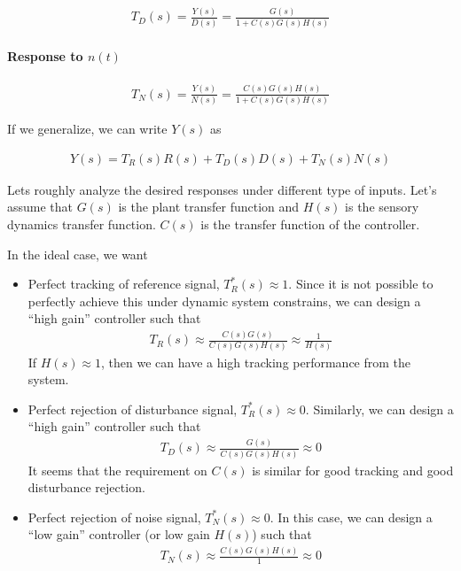 \documentclass[twoside]{article}
\begin{document}
    \begin{align*}
  	T_D(s) =  \frac{Y(s)}{D(s)} =  \frac{G(s)}{1 + C(s) G(s) H(s)}
  \end{align*}
  
    \paragraph{Response to $n(t)$}
    
\begin{align*}
  	T_N(s) =  \frac{Y(s)}{N(s)} =  \frac{C(s) G(s) H(s)}{1 + C(s) G(s) H(s)}
  \end{align*}
 
  If we generalize, we can write $Y(s)$ as 
  
  \begin{align*}
  Y(s) = T_R(s) R(s) + T_D(s) D(s) + T_N(s) N(s)
  \end{align*}
  
  Lets roughly analyze the desired responses under different type of inputs. 
  Let's assume that $G(s)$ is the plant transfer function and $H(s)$ is the sensory 
  dynamics transfer function. $C(s)$ is the 
  transfer function of the controller.
  
  In the ideal case, we want 
  \begin{itemize}
  	\item Perfect tracking of reference signal, $T^*_R(s) \approx 1 $. 
	Since it is not possible to perfectly achieve this under dynamic system constrains,
	we can design a ``high gain'' controller such that 
	  \begin{align*}
	  	T_R(s) \approx \frac{C(s) G(s)}{C(s) G(s) H(s)} \approx \frac{1}{H(s)}
	  \end{align*}
	  If $H(s) \approx 1$, then we can have a high tracking performance from the system. 
	  \item Perfect rejection of disturbance signal, $T^*_R(s) \approx 0 $. Similarly, 
	  we can design a ``high gain'' controller such that 
	  \begin{align*}
	  	T_D(s) \approx \frac{G(s)}{C(s) G(s) H(s)} \approx 0
	  \end{align*}
	  It seems that the requirement on $C(s)$ is similar for good tracking and
	  good disturbance rejection. 
	  \item Perfect rejection of noise signal, $T^*_N(s) \approx 0 $. In this case, we can design a 
	  ``low gain'' controller (or low gain $H(s)$) such that 
	  	  \begin{align*}
	  	T_N(s) \approx \frac{C(s) G(s) H(s)}{1} \approx 0
	  \end{align*}
  \end{itemize}
  
\end{document}
